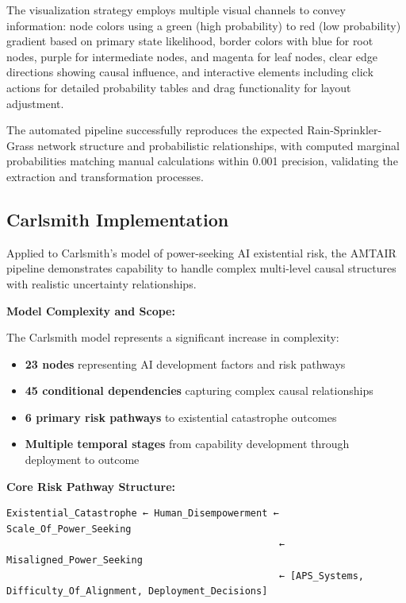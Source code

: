 \documentclass[
  11pt,
  letterpaper,
]{book}
\providecommand{\tightlist}{%
  \setlength{\itemsep}{0pt}\setlength{\parskip}{0pt}}
\begin{document}
The visualization strategy employs multiple visual channels to convey
information: node colors using a green (high probability) to red (low
probability) gradient based on primary state likelihood, border colors
with blue for root nodes, purple for intermediate nodes, and magenta for
leaf nodes, clear edge directions showing causal influence, and
interactive elements including click actions for detailed probability
tables and drag functionality for layout adjustment.

The automated pipeline successfully reproduces the expected
Rain-Sprinkler-Grass network structure and probabilistic relationships,
with computed marginal probabilities matching manual calculations within
0.001 precision, validating the extraction and transformation processes.

\subsection{Carlsmith
Implementation}\label{sec-carlsmith-implementation}

Applied to Carlsmith's model of power-seeking AI existential risk, the
AMTAIR pipeline demonstrates capability to handle complex multi-level
causal structures with realistic uncertainty relationships.

\textbf{Model Complexity and Scope:}

The Carlsmith model represents a significant increase in complexity:

\begin{itemize}
\tightlist
\item
  \textbf{23 nodes} representing AI development factors and risk
  pathways
\item
  \textbf{45 conditional dependencies} capturing complex causal
  relationships
\item
  \textbf{6 primary risk pathways} to existential catastrophe outcomes
\item
  \textbf{Multiple temporal stages} from capability development through
  deployment to outcome
\end{itemize}

\textbf{Core Risk Pathway Structure:}

\begin{verbatim}
Existential_Catastrophe ← Human_Disempowerment ← Scale_Of_Power_Seeking
                                                ← Misaligned_Power_Seeking
                                                ← [APS_Systems, Difficulty_Of_Alignment, Deployment_Decisions]
\end{verbatim}
\end{document}
